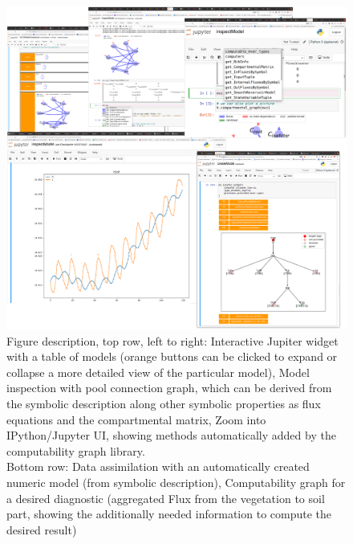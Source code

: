 \begin{figure}[h]
\includegraphics[width=\columnwidth]{TabScreenCombined.pdf}
  \caption{
      Figure description, top row, left to right: Interactive Jupiter widget
      with a table of models (orange buttons can be clicked to expand or
      collapse a more detailed view of the particular model), Model inspection
      with pool connection graph, which can be derived from the symbolic
      description along other symbolic properties as flux equations and the
      compartmental matrix, Zoom into IPython/Jupyter UI, showing methods
      automatically added by the computability graph library.  \\ Bottom row:
      Data assimilation with an automatically created numeric model (from
      symbolic description), Computability graph for a desired diagnostic
      (aggregated Flux from the vegetation to soil part, showing the
      additionally needed information to compute the desired result)
  }
  \label{fig:overview}
\end{figure}

